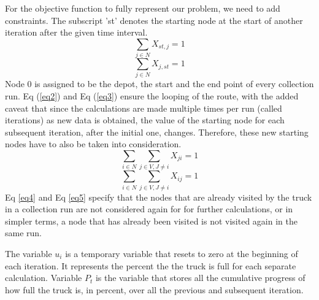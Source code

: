 \documentclass[12pt]{article}
\begin{document}
For the objective function to fully represent our problem, we need to add constraints. The subscript 'st' denotes the starting node at the start of another iteration after the given time interval.
\begin{equation}\label{eq2}
    \sum_{j\in N}X_{st,j}=1
\end{equation}
\begin{equation}\label{eq3}
    \sum_{j\in N}X_{j,st}=1
\end{equation}
Node 0 is assigned to be the depot, the start and the end point of every collection run. Eq (\ref{eq2}) and Eq (\ref{eq3}) ensure the looping of the route, with the added caveat that since the calculations are made multiple times per run (called iterations) as new data is obtained, the value of the starting node for each subsequent iteration, after the initial one, changes. Therefore, these new starting nodes have to also be taken into consideration.
\begin{equation}\label{eq4}
    \sum_{i\in N}\sum_{j\in V, J\ne i} X_{ji}=1
\end{equation}
\begin{equation}\label{eq5}
    \sum_{i\in N}\sum_{j\in V, J\ne i} X_{ij}=1
\end{equation}
Eq \eqref{eq4} and Eq \eqref{eq5} specify that the nodes that are already visited by the truck in a collection run are not considered again for for further calculations, or in simpler terms, a node that has already been visited is not visited again in the same run.

The variable $u_i$ is a temporary variable that resets to zero at the beginning of each iteration. It represents the percent the the truck is full for each separate calculation. Variable $P_t$ is the variable that stores all the cumulative progress of how full the truck is, in percent, over all the previous and subsequent iteration.
\end{document}
